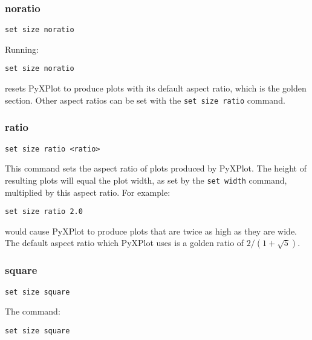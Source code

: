 \subsubsection{noratio}

\begin{verbatim}
set size noratio
\end{verbatim}

Running:

\begin{verbatim}
set size noratio
\end{verbatim}

\noindent resets PyXPlot to produce plots with its default aspect ratio, which is the
golden section. Other aspect ratios can be set with the {\tt set size ratio}
command.


\subsubsection{ratio}

\begin{verbatim}
set size ratio <ratio>
\end{verbatim}

This command sets the aspect ratio of plots produced by PyXPlot.  The height of
resulting plots will equal the plot width, as set by the {\tt set width}
command, multiplied by this aspect ratio.  For example:

\begin{verbatim}
set size ratio 2.0
\end{verbatim}

\noindent would cause PyXPlot to produce plots that are twice as high as they
are wide.  The default aspect ratio which PyXPlot uses is a golden ratio of
$2/(1+\sqrt{5})$.


\subsubsection{square}

\begin{verbatim}
set size square
\end{verbatim}

The command:

\begin{verbatim}
set size square
\end{verbatim}

